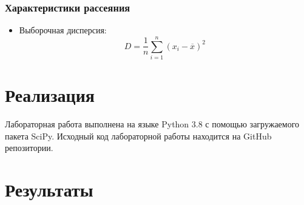 \documentclass[12pt,a4paper]{article}
\begin{document}
			\subsubsection{Характеристики рассеяния}
				\begin{itemize}
					\item Выборочная дисперсия:
					\begin{equation}
						D=\frac{1}{n}\sum_{i=1}^{n}(x_i-\overline{x})^2
					\end{equation}
				\end{itemize}
	\newpage
	
	\section{Реализация}
	Лабораторная работа выполнена на языке Python 3.8 с помощью загружаемого пакета SciPy. Исходный код лабораторной работы находится на GitHub репозитории.
	\newpage
	
	\section{Результаты}
\end{document}
